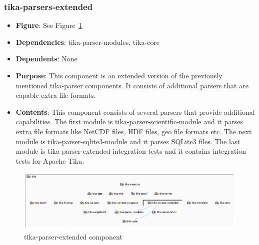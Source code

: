 \documentclass{article}
\begin{document}
\subsubsection{tika-parsers-extended}
\begin {itemize}
\item \textbf{Figure}: See Figure~\ref{fig:tika-parser-extended}
\item \textbf{Dependencies}: tika-parser-modules, tika-core
\item \textbf{Dependents}: None
\item \textbf{Purpose}: This component is an extended version of the previously mentioned tika-parser components. It consists of additional parsers that are capable extra file formats.
\item \textbf{Contents}: This component consists of several parsers that provide additional capabilities. The first module is tika-parser-scientific-module and it parses extra file formats like NetCDF files, HDF files, geo file formats etc. The next module is tika-parser-sqlite3-module and it parses SQLite3 files. The last module is tika-parser-extended-integration-tests and it contains integration tests for Apache Tika.
\end{itemize}
\begin{figure}[ht]
    \centering
    \includegraphics[width=1\textwidth]{report/images/tikaparserextended.PNG}
    \caption{tika-parser-extended component}
    \label{fig:tika-parser-extended}
\end{figure}
\end{document}
